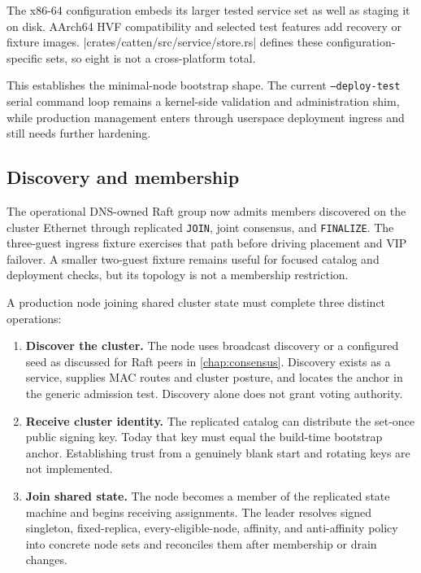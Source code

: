 The x86-64 configuration embeds its larger tested service set as well as staging
it on disk. AArch64 HVF compatibility and selected test features add recovery or
fixture images. \repofile|crates/catten/src/service/store.rs| defines these
configuration-specific sets, so eight is not a cross-platform total.

This establishes the minimal-node bootstrap shape. The current
\texttt{--deploy-test} serial command loop remains a kernel-side validation and
administration shim, while production management enters through userspace deployment
ingress and still needs further hardening.

\subsection{Discovery and membership}

The operational DNS-owned Raft group now admits members discovered on the
cluster Ethernet through replicated \texttt{JOIN}, joint consensus, and
\texttt{FINALIZE}. The three-guest ingress fixture exercises that path before
driving placement and VIP failover. A smaller two-guest fixture remains useful
for focused catalog and deployment checks, but its topology is not a membership
restriction.

A production node joining shared cluster state must complete three distinct
operations:

\begin{enumerate}
    \item \textbf{Discover the cluster.} The node uses broadcast discovery
        or a configured seed as discussed for Raft peers in
        \autoref{chap:consensus}.
        Discovery exists as a service, supplies MAC routes and cluster
        posture, and locates the anchor in the generic admission test.
        Discovery alone does not grant voting authority.

    \item \textbf{Receive cluster identity.} The replicated catalog can
        distribute the set-once public signing key. Today that key must
        equal the build-time bootstrap anchor. Establishing trust from a
        genuinely blank start and rotating keys are not implemented.

    \item \textbf{Join shared state.} The node becomes a member of the
        replicated state machine and begins receiving assignments. The leader
        resolves signed singleton, fixed-replica, every-eligible-node, affinity,
        and anti-affinity policy into concrete node sets and reconciles them
        after membership or drain changes.
\end{enumerate}

